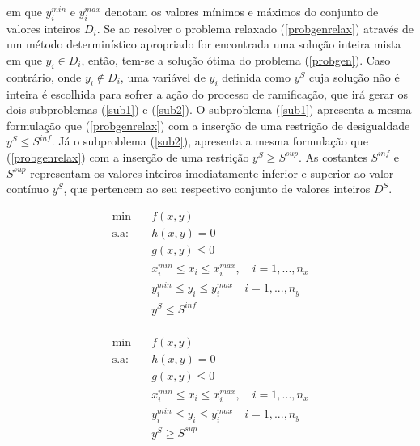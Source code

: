 \documentclass[
	12pt,				%
	openany,			%
	twoside,			%
	a4paper,			%
	chapter=TITLE,		%
	section=Title,		%
	subsection=Title,	%
	subsubsection=Title,%
	english,			%
	french,				%
	spanish,			%
	brazil			%
	]{abntex2}
\begin{document}
\begin{ERRATA}
\noindent em que $y^{min}_i$ e $y^{max}_i$ denotam os valores mínimos e máximos do conjunto de valores inteiros $D_i$. Se ao resolver o problema relaxado (\ref{probgenrelax}) através de um método determinístico apropriado for encontrada uma solução inteira mista em que $y_i \in D_i$, então, tem-se a solução ótima do problema (\ref{probgen}). Caso contrário, onde $y_i \notin D_i$, uma variável de $y_i$ definida como $y^S$ cuja solução não é inteira é escolhida para sofrer a ação do processo de ramificação, que irá gerar os dois subproblemas (\ref{sub1}) e (\ref{sub2}). O subproblema (\ref{sub1}) apresenta a mesma formulação que (\ref{probgenrelax}) com a inserção de uma restrição de desigualdade $y^S \leq S^{inf}$. Já o subproblema (\ref{sub2}), apresenta a mesma formulação que (\ref{probgenrelax}) com a inserção de uma restrição $y^S \geq S^{sup}$. As costantes $S^{inf}$ e $S^{sup}$ representam os valores inteiros imediatamente inferior e superior ao valor contínuo $y^S$, que pertencem ao seu respectivo conjunto de valores inteiros $D^S$. 

\begin{equation} \label{sub1}
\begin{aligned}
\text{min}  & \quad f(x,y) \\
\text{s.a:} &\quad   h(x,y) = 0 \\
&\quad   g(x,y) \leq 0 \\
&\quad x^{min}_i \leq x_i \leq x^{max}_i,\quad i=1,...,n_x\\
&\quad y^{min}_i \leq y_i \leq y^{max}_i \quad i=1,...,n_y\\
&\quad y^S \leq S^{inf}\\
\end{aligned}
\end{equation}


\begin{equation} \label{sub2}
\begin{aligned}
\text{min}  & \quad f(x,y) \\
\text{s.a:} &\quad   h(x,y) = 0 \\
&\quad   g(x,y) \leq 0 \\
&\quad x^{min}_i \leq x_i \leq x^{max}_i,\quad i=1,...,n_x\\
&\quad y^{min}_i \leq y_i \leq y^{max}_i \quad i=1,...,n_y\\
&\quad y^S \geq S^{sup}\\
\end{aligned}
\end{equation}


\end{ERRATA}
\end{document}
